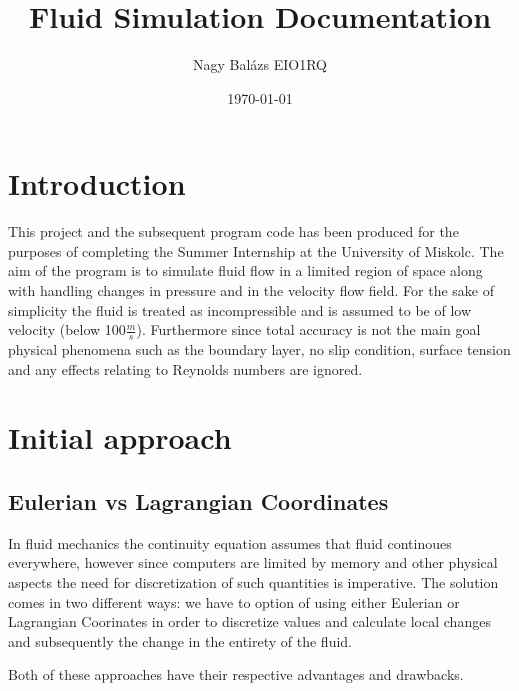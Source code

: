 \documentclass[15pt, titlepage]{article}
\begin{document}
\pagestyle{fancy}

\title{Fluid Simulation Documentation}
\author{Nagy Balázs EIO1RQ}
\date{\today}
\maketitle

\tableofcontents

\pagebreak

\section{Introduction}

This project and the subsequent program code has been produced for the purposes of completing the Summer Internship at the University of Miskolc. The aim of the program is to simulate fluid flow in a limited region of space along with handling changes in pressure and in the velocity flow field. For the sake of simplicity the fluid is treated as incompressible and is assumed to be of low velocity (below 100$\frac{m}{s}$). Furthermore since total accuracy is not the main goal physical phenomena such as the boundary layer, no slip condition, surface tension and any effects relating to Reynolds numbers are ignored.

\section{Initial approach}

\subsection{Eulerian vs Lagrangian Coordinates}
In fluid mechanics the continuity equation assumes that fluid continoues everywhere, however since computers are limited by memory and other physical aspects the need for discretization of such quantities is imperative. The solution comes in two different ways: we have to option of using either Eulerian or Lagrangian Coorinates in order to discretize values and calculate local changes and subsequently the change in the entirety of the fluid.

Both of these approaches have their respective advantages and drawbacks.
\end{document}
